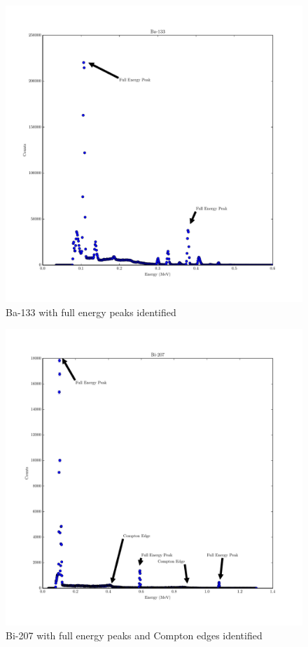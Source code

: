 \documentclass[reprint, nobibnotes, amssymb, amsmath, amsfonts, physics, mathtools, mathrsfs, floatfix]{revtex4-1}
\begin{document}
\begin{widetext}
      \begin{figure}[h]
        \centering
        \includegraphics[width=\linewidth]{../plots/Ba-133.pdf}
        \caption{Ba-133 with full energy peaks identified \label{fig:ba}}
      \end{figure}

      \begin{figure}[h]
        \centering
        \includegraphics[width=\linewidth]{../plots/Bi-207.pdf}
        \caption{Bi-207 with full energy peaks and Compton edges identified \label{fig:bi}}
      \end{figure}


\end{widetext}
\end{document}
